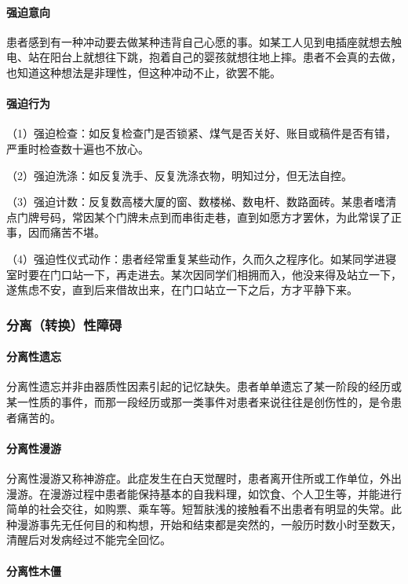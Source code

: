\paragraph{强迫意向}

患者感到有一种冲动要去做某种违背自己心愿的事。如某工人见到电插座就想去触电、站在阳台上就想往下跳，抱着自己的婴孩就想往地上摔。患者不会真的去做，也知道这种想法是非理性，但这种冲动不止，欲罢不能。
\paragraph{强迫行为}

（1）强迫检查：如反复检查门是否锁紧、煤气是否关好、账目或稿件是否有错，严重时检查数十遍也不放心。

（2）强迫洗涤：如反复洗手、反复洗涤衣物，明知过分，但无法自控。

（3）强迫计数：反复数高楼大厦的窗、数楼梯、数电杆、数路面砖。某患者嗜清点门牌号码，常因某个门牌未点到而串街走巷，直到如愿方才罢休，为此常误了正事，因而痛苦不堪。

（4）强迫性仪式动作：患者经常重复某些动作，久而久之程序化。如某同学进寝室时要在门口站一下，再走进去。某次因同学们相拥而入，他没来得及站立一下，遂焦虑不安，直到后来借故出来，在门口站立一下之后，方才平静下来。

\subsubsection{分离（转换）性障碍}
\paragraph{分离性遗忘}

分离性遗忘并非由器质性因素引起的记忆缺失。患者单单遗忘了某一阶段的经历或某一性质的事件，而那一段经历或那一类事件对患者来说往往是创伤性的，是令患者痛苦的。
\paragraph{分离性漫游}

分离性漫游又称神游症。此症发生在白天觉醒时，患者离开住所或工作单位，外出漫游。在漫游过程中患者能保持基本的自我料理，如饮食、个人卫生等，并能进行简单的社会交往，如购票、乘车等。短暂肤浅的接触看不出患者有明显的失常。此种漫游事先无任何目的和构想，开始和结束都是突然的，一般历时数小时至数天，清醒后对发病经过不能完全回忆。
\paragraph{分离性木僵}

